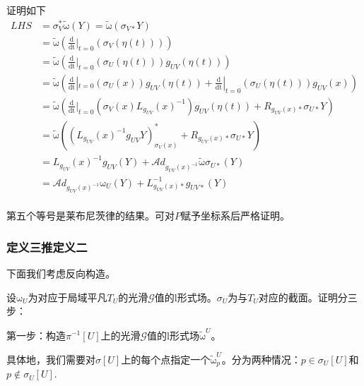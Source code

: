 \documentclass{ctexbook}
\begin{document}
证明如下
\begin{equation}
    \begin{split}
        LHS
        &=\sigma_V^{*}\tilde{\mathrm{\omega}}(Y)
         =\tilde{\mathrm{\omega}}(\sigma_{V*}Y)\\
        &=\tilde{\mathrm{\omega}}\left(\frac{\mathrm{d}}{\mathrm{dt}}|_{t=0}\left(\sigma_{V}\left(\eta(t)\right)\right)\right)\\
        &=\tilde{\mathrm{\omega}}\left(\frac{\mathrm{d}}{\mathrm{dt}}|_{t=0}\left(\sigma_{U}\left(\eta(t)\right)\right)g_{UV}\left(\eta(t)\right)\right)\\
        &=\tilde{\mathrm{\omega}}\left(\frac{\mathrm{d}}{\mathrm{dt}}|_{t=0}\left(\sigma_{U}\left(x\right)\right)g_{UV}\left(\eta(t)\right)+\frac{\mathrm{d}}{\mathrm{dt}}|_{t=0}\left(\sigma_{U}\left(\eta(t)\right)\right)g_{UV}\left(x\right)\right)\\
        &=\tilde{\mathrm{\omega}}\left(\frac{\mathrm{d}}{\mathrm{dt}}|_{t=0}\left(\sigma_{V}\left(x\right)L_{g_{UV}}(x)^{-1}\right)g_{UV}\left(\eta(t)\right)+R_{g_{UV}(x)*}\sigma_{U*}Y\right)\\
        &=\tilde{\mathrm{\omega}}\left(\left(L_{g_{UV}}(x)^{-1}g_{UV}Y\right)^{*}_{\sigma_V(x)}+R_{g_{UV}(x)*}\sigma_{U*}Y\right)\\
        &=L_{g_{UV}}(x)^{-1}g_{UV}(Y)+\mathscr{A}d_{g_{UV}(x)^{-1}}\tilde{\mathrm{\omega}}\sigma_{U*}(Y)\\
        &=\mathscr{A}d_{g_{UV}(x)^{-1}}\mathrm{\omega}_U(Y)+L^{-1}_{g_{UV}(x)*}g_{UV*}(Y) \\
    \end{split}    
\end{equation}

第五个等号是莱布尼茨律的结果。可对$P$赋予坐标系后严格证明。

\subsubsection{定义三推定义二}
下面我们考虑反向构造。

设$\mathrm{\omega}_U$为对应于局域平凡$T_U$的光滑$\mathscr{G}$值的$\mathrm{l}$形式场。$\sigma_U$为与$T_U$对应的截面。证明分三步：

第一步：构造$\pi^{-1}[U]$上的光滑$\mathscr{G}$值的$\mathrm{l}$形式场$\tilde{\mathrm{\omega}}^{U}$。

具体地，我们需要对$\sigma[U]$上的每个点指定一个$\tilde{\mathrm{\omega}}^{U}_{p}$。分为两种情况：$p\in\sigma_U[U]$和$p\notin\sigma_U[U]$.
\end{document}
